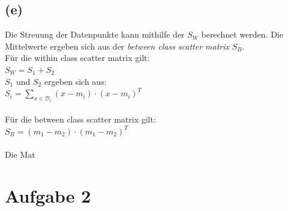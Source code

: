 \documentclass[a4paper]{scrartcl}
\newcounter{punkte}
\begin{document}
\subsection*{(e)}
Die Streuung der Datenpunkte kann mithilfe der  $S_W$ berechnet werden. Die Mittelwerte ergeben sich aus der \textit{between class scatter matrix} $S_B$.\\
Für die within class scatter matrix gilt:\\
$
S_W = S_1 + S_2
$\\
$S_1$ und $S_2$ ergeben sich aus:\\
$
S_i = \sum_{x\in\mathcal{D}_i}(x-m_i)\cdot(x-m_i)^T
$\\
\\
Für die between class scatter matrix gilt:\\
$
S_B = (m_1 - m_2)\cdot(m_1-m_2)^T
$\\
\\
Die Mat




\section*{Aufgabe 2}
\end{document}
